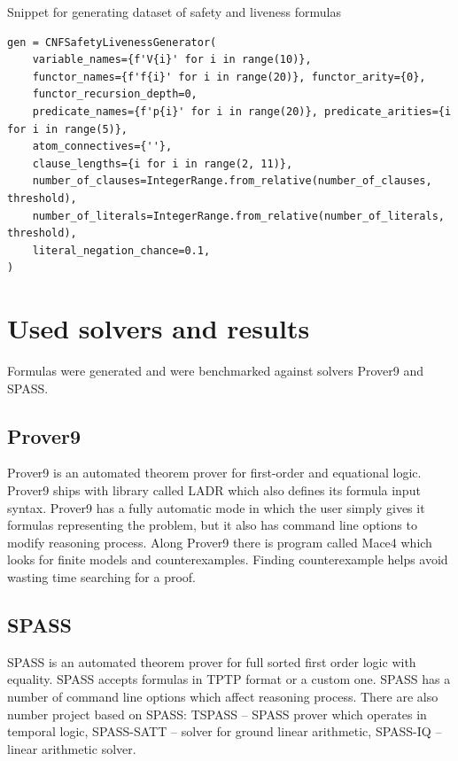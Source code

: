 \begin{listing}[ht]
  \caption{Snippet for generating dataset of safety and liveness formulas}
  \label{lis:CNFSafetyLivenesSnippet}
\begin{verbatim}
gen = CNFSafetyLivenessGenerator(
    variable_names={f'V{i}' for i in range(10)},
    functor_names={f'f{i}' for i in range(20)}, functor_arity={0},
    functor_recursion_depth=0,
    predicate_names={f'p{i}' for i in range(20)}, predicate_arities={i for i in range(5)},
    atom_connectives={''},
    clause_lengths={i for i in range(2, 11)},
    number_of_clauses=IntegerRange.from_relative(number_of_clauses, threshold),
    number_of_literals=IntegerRange.from_relative(number_of_literals, threshold),
    literal_negation_chance=0.1,
)
\end{verbatim}
\end{listing}

\section{Used solvers and results}
\label{sec:SolversAndResults}

Formulas were generated and were benchmarked against solvers Prover9 and SPASS.

\subsection{Prover9}
\label{sec:Prover9}

Prover9 \cite{prover9-mace4} is an automated theorem prover for first-order and equational logic. Prover9 ships with library called LADR which also defines its formula input syntax. Prover9 has a fully automatic mode in which the user simply gives it formulas representing the problem, but it also has command line options to modify reasoning process. Along Prover9 there is program called Mace4 which looks for finite models and counterexamples. Finding counterexample helps avoid wasting time searching for a proof.

\subsection{SPASS}
\label{sec:SPASS}

SPASS is an automated theorem prover for full sorted first order logic with equality. SPASS accepts formulas in TPTP format or a custom one. SPASS has a number of command line options which affect reasoning process.
There are also number project based on SPASS: TSPASS -- SPASS prover which operates in temporal logic, SPASS-SATT -- solver for ground linear arithmetic, SPASS-IQ -- linear arithmetic solver.

